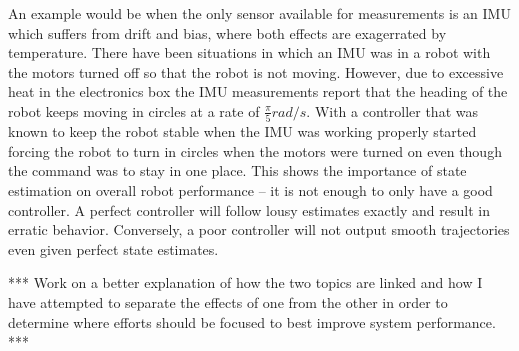 An example would be when the only sensor available for measurements is an IMU which suffers from drift and bias, where both effects are exagerrated by temperature. There have been situations in which an IMU was in a robot with the motors turned off so that the robot is not moving. However, due to excessive heat in the electronics box the IMU measurements report that the heading of the robot keeps moving in circles at a rate of $\frac{\pi}{5} rad/s$. With a controller that was known to keep the robot stable when the IMU was working properly started forcing the robot to turn in circles when the motors were turned on even though the command was to stay in one place. This shows the importance of state estimation on overall robot performance -- it is not enough to only have a good controller. A perfect controller will follow lousy estimates exactly and result in erratic behavior. Conversely, a poor controller will not output smooth trajectories even given perfect state estimates.

*** Work on a better explanation of how the two topics are linked and how I have attempted to separate the effects of one from the other in order to determine where efforts should be focused to best improve system performance. ***

